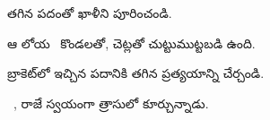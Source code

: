 \begin{questions}
 తగిన పదంతో ఖాళీని పూరించండి.\par
ఆ లోయ \blank\ కొండలతో, చెట్లతో చుట్టుముట్టబడి ఉంది.

 బ్రాకెట్‌లో ఇచ్చిన పదానికి తగిన ప్రత్యయాన్ని  చేర్చండి.\par
\blank\ , రాజే స్వయంగా త్రాసులో కూర్చున్నాడు.

\end{questions}
